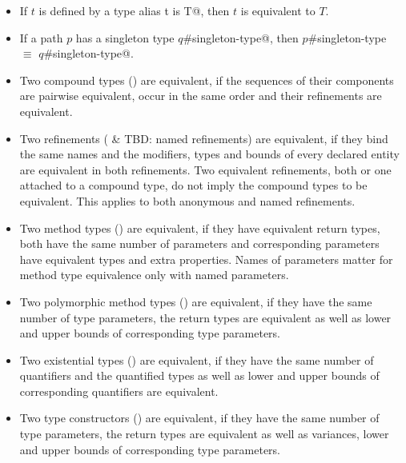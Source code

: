 \begin{itemize}
\item
If $t$ is defined by a type alias \lstinline@type t is T@, then $t$ is equivalent to $T$. 

\item
If a path $p$ has a singleton type \lstinline@$q$#singleton-type@, then \lstinline@$p$#singleton-type $\equiv$ $q$#singleton-type@. 

\item
Two compound types () are equivalent, if the sequences of their components are pairwise equivalent, occur in the same order and their refinements are equivalent.

\item 
Two refinements ( \& TBD: named refinements) are equivalent, if they bind the same names and the modifiers, types and bounds of every declared entity are equivalent in both refinements. Two equivalent refinements, both or one attached to a compound type, do not imply the compound types to be equivalent. This applies to both anonymous and named refinements. 

\item
Two method types () are equivalent, if they have equivalent return types, both have the same number of parameters and corresponding parameters have equivalent types and extra properties. Names of parameters matter for method type equivalence only with named parameters. 

\item
Two polymorphic method types () are equivalent, if they have the same number of type parameters, the return types are equivalent as well as lower and upper bounds of corresponding type parameters. 

\item
Two existential types () are equivalent, if they have the same number of quantifiers and the quantified types as well as lower and upper bounds of corresponding quantifiers are equivalent. 

\item
Two type constructors () are equivalent, if they have the same number of type parameters, the return types are equivalent as well as variances, lower and upper bounds of corresponding type parameters. 

\end{itemize}






